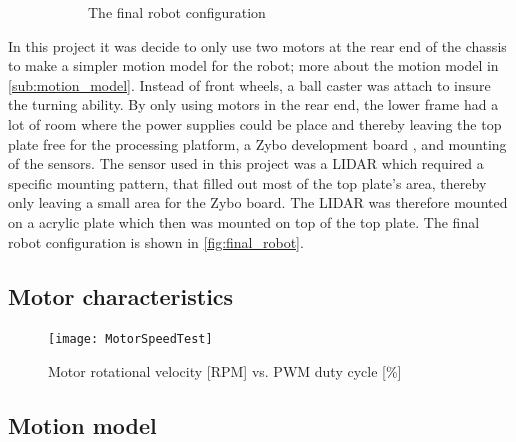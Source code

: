 \documentclass[Main]{subfiles}
\begin{document}
\begin{figure}[H]
\begin{subfigure}[b]{0.4\linewidth}
				\caption{The final robot configuration}
				\label{fig:final_robot}
			\end{subfigure}
		\caption{}
		\label{fig:robots}
		\end{figure}
		In this project it was decide to only use two motors at the rear end of the chassis to make a simpler motion model for the robot; more about the motion model in \autoref{sub:motion_model}. 
		Instead of front wheels, a ball caster was attach to insure the turning ability. 
		By only using motors in the rear end, the lower frame had a lot of room where the power supplies could be place and thereby leaving the top plate free for the processing platform, a Zybo development board , and mounting of the sensors. 
		The sensor used in this project was a LIDAR  which required a specific mounting pattern, that filled out most of the top plate's area, thereby only leaving a small area for the Zybo board. 
		The LIDAR was therefore mounted on a acrylic plate which then was mounted on top of the top plate. 
		The final robot configuration is shown in \autoref{fig:final_robot}.
		

	\subsection{Motor characteristics} %
	\label{sub:motor_characteristics}

		

		\begin{figure}[H]
			\centering
			\texttt{[image: MotorSpeedTest]}
			\caption{Motor rotational velocity [RPM] vs. PWM duty cycle [\%]}
			\label{fig:motor_speed_test}
		\end{figure}
		

	\subsection{Motion model} %
	\label{sub:motion_model}
\end{document}
